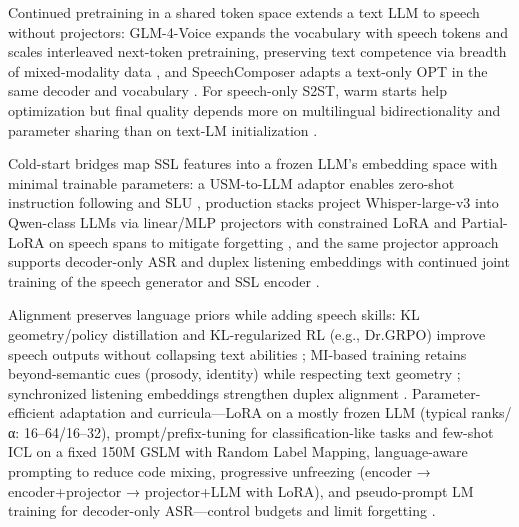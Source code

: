 Continued pretraining in a shared token space extends a text LLM to speech without projectors: GLM-4-Voice expands the vocabulary with speech tokens and scales interleaved next-token pretraining, preserving text competence via breadth of mixed-modality data \cite{zeng2024scalingspeechtextpretrainingsyntheticint}, and SpeechComposer adapts a text-only OPT in the same decoder and vocabulary \cite{wu2024speechcomposerunifyingmultiplespeechtask}. For speech-only S2ST, warm starts help optimization but final quality depends more on multilingual bidirectionality and parameter sharing than on text-LM initialization \cite{peng2024mslms2stmultitaskspeechlanguagemodeltext}.

Cold-start bridges map SSL features into a frozen LLM’s embedding space with minimal trainable parameters: a USM-to-LLM adaptor enables zero-shot instruction following and SLU \cite{wang2023slmbridgethingapbetweenspeechtextfoundat}, production stacks project Whisper-large-v3 into Qwen-class LLMs via linear/MLP projectors with constrained LoRA and Partial-LoRA on speech spans to mitigate forgetting \cite{wang2024blspemotowardsempatheticlargespeechlangu}, and the same projector approach supports decoder-only ASR and duplex listening embeddings with continued joint training of the speech generator and SSL encoder \cite{tsunoo2024decoderonlyarchitecturespeechrecognition,ma2024languagemodelcanlistenwhilespeaking}.

Alignment preserves language priors while adding speech skills: KL geometry/policy distillation and KL-regularized RL (e.g., Dr.GRPO) improve speech outputs without collapsing text abilities \cite{wang2024blspemotowardsempatheticlargespeechlangu,li2025seewossubmissionmlcslmlessonslearnedspee}; MI-based training retains beyond-semantic cues (prosody, identity) while respecting text geometry \cite{wang2025bossbeyondsemanticspeech}; synchronized listening embeddings strengthen duplex alignment \cite{ma2024languagemodelcanlistenwhilespeaking}. Parameter-efficient adaptation and curricula—LoRA on a mostly frozen LLM (typical ranks/α: 16–64/16–32), prompt/prefix-tuning for classification-like tasks and few-shot ICL on a fixed 150M GSLM with Random Label Mapping, language-aware prompting to reduce code mixing, progressive unfreezing (encoder → encoder+projector → projector+LLM with LoRA), and pseudo-prompt LM training for decoder-only ASR—control budgets and limit forgetting \cite{hsu2024exploringcontextlearningtextlessspeechla,li2025seewossubmissionmlcslmlessonslearnedspee,nguyen2025qwenvsgemmaintegrationwhispercomparative,tsunoo2024decoderonlyarchitecturespeechrecognition}.

